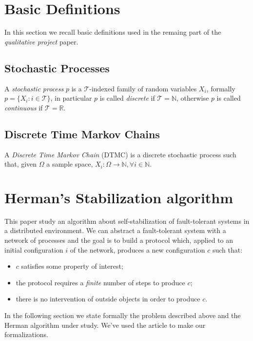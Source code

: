 

\section{Basic Definitions}

In this section we recall basic definitions used in the remaing part
of the \emph{qualitative project} paper.

\subsection{Stochastic Processes}

A \emph{stochastic process} $p$ is a $\mathcal{T}$-indexed family of
random variables $X_i$, formally $p = \{X_i: i \in \mathcal{T}\}$, in
particular $p$ is called \emph{discrete} if $\mathcal{T} = \mathbb{N}
$, otherwise $p$ is called \emph{continuous} if $\mathcal{T} =
\mathbb{R} $.


\subsection{Discrete Time Markov Chains}

A \emph{Discrete Time Markov Chain} (DTMC) is a discrete stochastic
process such that, given $\Omega$ a sample space, $X_i:\Omega
\rightarrow \mathbb{N}, \forall i\in \mathbb{N} $.

\section{Herman's Stabilization algorithm}

This paper study an algorithm about self-stabilization of
fault-tolerant systems in a distributed environment. We can abstract a
fault-tolerant system with a network of processes and the goal is to
build a protocol which, applied to an initial configuration $i$ of the
network, produces a new configuration $c$ such that:
\begin{itemize}
\item $c$ satisfies some property of interest;
\item the protocol requires a \emph{finite} number of steps to produce
  $c$;
\item there is no intervention of outside objects in order to produce
  $c$.
\end{itemize}
In the following section we state formally the problem described above
and the Herman algorithm under study. We've used the article \cite{
  KNP12a} to make our formalizations.


